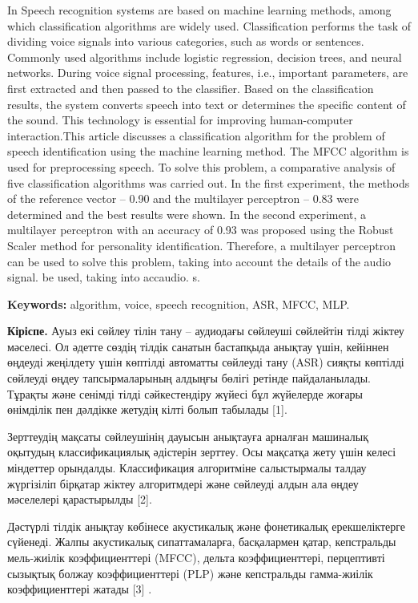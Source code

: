 \documentclass[
]{article}
\begin{document}
In Speech recognition systems are based on machine learning methods,
among which classification algorithms are widely used. Classification
performs the task of dividing voice signals into various categories,
such as words or sentences. Commonly used algorithms include logistic
regression, decision trees, and neural networks. During voice signal
processing, features, i.e., important parameters, are first extracted
and then passed to the classifier. Based on the classification results,
the system converts speech into text or determines the specific content
of the sound. This technology is essential for improving human-computer
interaction.This article discusses a classification algorithm for the
problem of speech identification using the machine learning method. The
MFCC algorithm is used for preprocessing speech. To solve this problem,
a comparative analysis of five classification algorithms was carried
out. In the first experiment, the methods of the reference vector --
0.90 and the multilayer perceptron -- 0.83 were determined and the best
results were shown. In the second experiment, a multilayer perceptron
with an accuracy of 0.93 was proposed using the Robust Scaler method for
personality identification. Therefore, a multilayer perceptron can be
used to solve this problem, taking into account the details of the audio
signal. be used, taking into accaudio. s.

\textbf{Keywords:} algorithm, voice, speech recognition, ASR, MFCC, MLP.

\textbf{Кіріспе.} Ауыз екі сөйлеу тілін тану -- аудиодағы сөйлеуші
сөйлейтін тілді жіктеу мәселесі. Ол әдетте сөздің тілдік санатын
бастапқыда анықтау үшін, кейіннен өңдеуді жеңілдету үшін көптілді
автоматты сөйлеуді тану (ASR) сияқты көптілді сөйлеуді өңдеу
тапсырмаларының алдыңғы бөлігі ретінде пайдаланылады. Тұрақты және
сенімді тілді сәйкестендіру жүйесі бұл жүйелерде жоғары өнімділік пен
дәлдікке жетудің кілті болып табылады {[}1{]}.

Зерттеудің мақсаты сөйлеушінің дауысын анықтауға арналған машиналық
оқытудың классификациялық әдістерін зерттеу. Осы мақсатқа жету үшін
келесі міндеттер орындалды. Классификация алгоритміне салыстырмалы
талдау жүргізіліп бірқатар жіктеу алгоритмдері және сөйлеуді алдын ала
өңдеу мәселелері қарастырылды {[}2{]}.

Дәстүрлі тілдік анықтау көбінесе акустикалық және фонетикалық
ерекшеліктерге сүйенеді. Жалпы акустикалық сипаттамаларға, басқалармен
қатар, кепстральды мель-жиілік коэффициенттері (MFCC), дельта
коэффициенттері, перцептивті сызықтық болжау коэффициенттері (PLP) және
кепстральды гамма-жиілік коэффициенттері жатады {[}3{]} .
\end{document}
